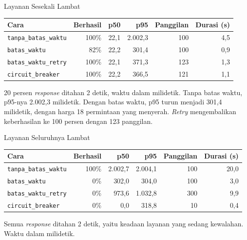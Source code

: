 \documentclass[aspectratio=169, table, 12pt]{beamer}
\begin{document}
\begin{frame}{{\Large Layanan Sesekali Lambat}}
  \vspace{4pt}
  \centering
  {\small
  \begin{tabularx}{\textwidth}{Xrrrrr}
    \hline
    \textbf{Cara} & \textbf{Berhasil} & \textbf{p50} & \textbf{p95} & \textbf{Panggilan} & \textbf{Durasi (s)} \\
    \hline
    \texttt{tanpa\_batas\_waktu} & 100\% & 22,1 & 2.002,3 & 100 & 4,5 \\
    \hline
    \texttt{batas\_waktu} & 82\% & 22,2 & 301,4 & 100 & 0,9 \\
    \hline
    \texttt{batas\_waktu\_retry} & 100\% & 22,1 & 371,3 & 123 & 1,3 \\
    \hline
    \texttt{circuit\_breaker} & 100\% & 22,2 & 366,5 & 121 & 1,1 \\
    \hline
  \end{tabularx}}

  \vspace{6pt}
  {\footnotesize 20 persen \textit{response} ditahan 2 detik, waktu dalam milidetik.
  Tanpa batas waktu, p95-nya 2.002,3 milidetik. Dengan batas waktu, p95 turun
  menjadi 301,4 milidetik, dengan harga 18 permintaan yang menyerah.
  \textit{Retry} mengembalikan keberhasilan ke 100 persen dengan 123
  panggilan.}
\end{frame}

\begin{frame}{{\Large Layanan Seluruhnya Lambat}}
  \vspace{4pt}
  \centering
  {\small
  \begin{tabularx}{\textwidth}{Xrrrrr}
    \hline
    \textbf{Cara} & \textbf{Berhasil} & \textbf{p50} & \textbf{p95} & \textbf{Panggilan} & \textbf{Durasi (s)} \\
    \hline
    \texttt{tanpa\_batas\_waktu} & 100\% & 2.002,7 & 2.004,1 & 100 & 20,0 \\
    \hline
    \texttt{batas\_waktu} & 0\% & 302,0 & 304,0 & 100 & 3,0 \\
    \hline
    \texttt{batas\_waktu\_retry} & 0\% & 973,6 & 1.032,8 & 300 & 9,9 \\
    \hline
    \texttt{circuit\_breaker} & 0\% & 0,0 & 318,8 & 10 & 0,4 \\
    \hline
  \end{tabularx}}

  \vspace{6pt}
  {\footnotesize Semua \textit{response} ditahan 2 detik, yaitu keadaan layanan yang
  sedang kewalahan. Waktu dalam milidetik.}
\end{frame}
\end{document}
